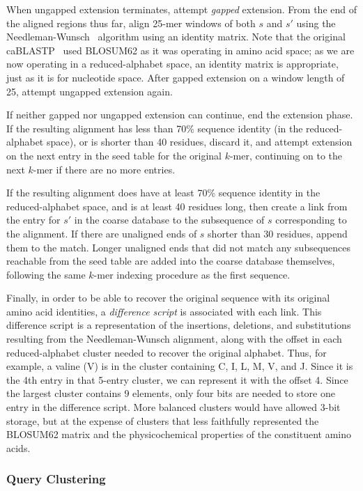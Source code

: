 \documentclass[review,preprint,12pt]{elsarticle}
\renewcommand{\cite}{\citep} %
\theoremstyle{definition}
\theoremstyle{remark}
\begin{document}
When ungapped extension terminates, attempt \textit{gapped} extension.
From the end of the aligned regions thus far, align 25-mer windows of both
$s$ and $s'$ using the Needleman-Wunsch~\cite{needleman1970general} algorithm 
using an identity matrix.
Note that the original caBLASTP~\cite{daniels2013compressive} used BLOSUM62 as 
it was
operating in amino acid space; as we are now operating in a reduced-alphabet
space, an identity matrix is appropriate, just as it is for nucleotide space.
After gapped extension on a window length of 25, attempt ungapped extension
again.

If neither gapped nor ungapped extension can continue, end the extension phase.
If the resulting alignment has less than 70\% sequence identity (in the 
reduced-alphabet space), or is shorter than 40 residues, discard it, and 
attempt extension on the next entry in the seed table for the original $k$-mer,
continuing on to the next $k$-mer if there are no more entries.

If the resulting alignment does have at least 70\% sequence identity in the
reduced-alphabet space, and is at least 40 residues long, then create a link
from the entry for $s'$ in the coarse database to the subsequence of $s$
corresponding to the alignment.
If there are unaligned ends of $s$ shorter than 30 residues, append them to the
match.
Longer unaligned ends that did not match any subsequences reachable from the
seed table are added into the coarse database themselves, following the same
$k$-mer indexing procedure as the first sequence.

Finally, in order to be able to recover the original sequence with its original
amino acid identities, a \textit{difference script} is associated with each
link.
This difference script is a representation of the insertions, deletions, and
substitutions resulting from the Needleman-Wunsch alignment, along with the
offset in each reduced-alphabet cluster needed to recover the original alphabet.
Thus, for example, a valine (V) is in the cluster containing C, I, L, M, V, and 
J.
Since it is the 4th entry in that 5-entry cluster, we can represent it with
the offset 4.
Since the largest cluster contains 9 elements, only four bits are needed to
store one entry in the difference script.
More balanced clusters would have allowed 3-bit storage, but at the expense of
clusters that less faithfully represented the BLOSUM62 matrix and the
physicochemical properties of the constituent amino acids.



\subsubsection{Query Clustering}
\end{document}
